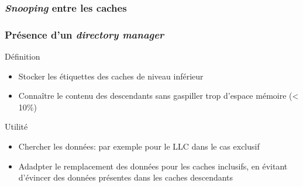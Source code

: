 \begin{frame}
  \frametitle{\emph{Snooping} entre les caches}
  
\end{frame}


\begin{frame}
  \frametitle{Présence d'un \emph{directory manager}}
\begin{block}{Définition}
  \begin{itemize}
  \item Stocker les étiquettes des caches de niveau inférieur
  \item Connaître le contenu des descendants sans gaspiller trop d'espace mémoire (< 10\%)
  \end{itemize}
\end{block}

\begin{block}{Utilité}
\begin{itemize}
\item Chercher les données: par exemple pour le LLC dans le cas exclusif
\item Adadpter le remplacement des données pour les caches inclusifs, en évitant d'évincer des données présentes dans les caches descendants
\end{itemize}
\end{block}  
\end{frame}
